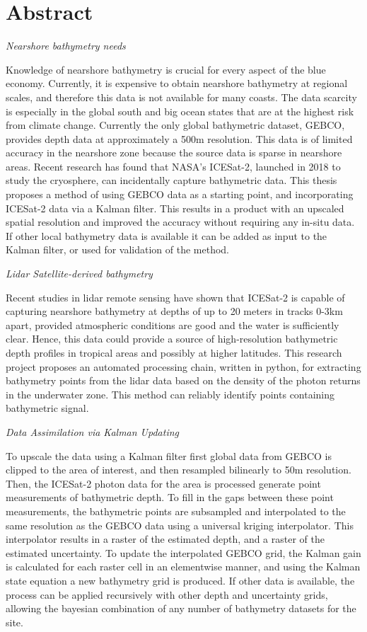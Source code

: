 \chapter*{Abstract}
\noindent\emph{Nearshore bathymetry needs}

\noindent Knowledge of nearshore bathymetry is crucial for every aspect of the blue economy. Currently, it is expensive to obtain nearshore bathymetry at regional scales, and therefore this data is not available for many coasts. The data scarcity is especially in the global south and big ocean states that are at the highest risk from climate change. Currently the only global bathymetric dataset, GEBCO, provides depth data at approximately a 500m resolution. This data is of limited accuracy in the nearshore zone because the source data is sparse in nearshore areas. Recent research has found that NASA's ICESat-2, launched in 2018 to study the cryosphere, can incidentally capture bathymetric data. This thesis proposes a method of using GEBCO data as a starting point, and incorporating ICESat-2 data via a Kalman filter. This results in a product with an upscaled spatial resolution and improved the accuracy without requiring any in-situ data. If other local bathymetry data is available it can be added as input to the Kalman filter, or used for validation of the method. 

\noindent\emph{Lidar Satellite-derived bathymetry}

\noindent Recent studies in lidar remote sensing have shown that ICESat-2 is capable of capturing nearshore bathymetry at depths of up to 20 meters in tracks 0-3km apart, provided atmospheric conditions are good and the water is sufficiently clear. Hence, this data could provide a source of high-resolution bathymetric depth profiles in tropical areas and possibly at higher latitudes. This research project proposes an automated processing chain, written in python, for extracting bathymetry points from the lidar data based on the density of the photon returns in the underwater zone. This method can reliably identify points containing bathymetric signal. 


\noindent\emph{Data Assimilation via Kalman Updating}

\noindent To upscale the data using a Kalman filter first global data from GEBCO is clipped to the area of interest, and then resampled bilinearly to 50m resolution. Then, the ICESat-2 photon data for the area is processed generate point measurements of bathymetric depth. To fill in the gaps between these point measurements, the bathymetric points are subsampled and interpolated to the same resolution as the GEBCO data using a universal kriging interpolator. This interpolator results in a raster of the estimated depth, and a raster of the estimated uncertainty. To update the interpolated GEBCO grid, the Kalman gain is calculated for each raster cell in an elementwise manner, and using the Kalman state equation a new bathymetry grid is produced. If other data is available, the process can be applied recursively with other depth and uncertainty grids, allowing the bayesian combination of any number of bathymetry datasets for the site.

